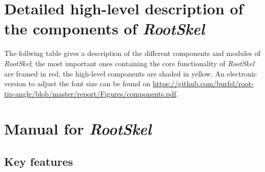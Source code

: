 

\chapter{Detailed high-level description of the components of \textit{RootSkel}}

The follwing table gives a description of the different components and modules of \textit{RootSkel}; the most important ones containing the core functionality of \textit{RootSkel} are framed in red, the high-level components are shaded in yellow. An electronic version to adjust the font size can be found on  \url{https://github.com/burfel/root-tip-angle/blob/master/report/Figures/components.pdf}.






\chapter{Manual for \textit{RootSkel}}\label{chp:manual}


\section{Key features} %

